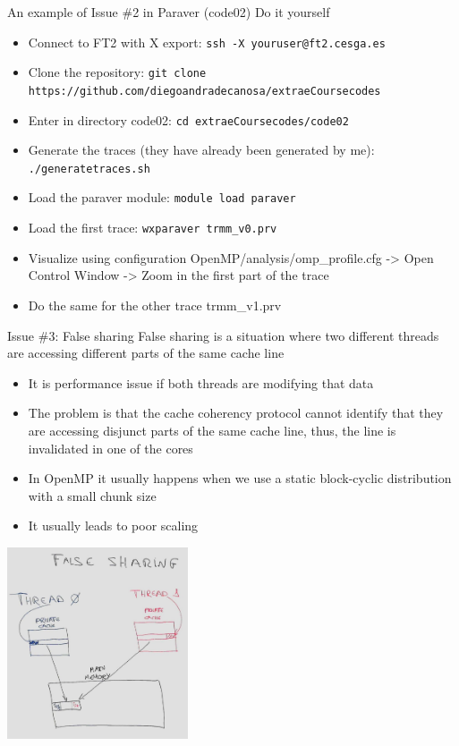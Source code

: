 \documentclass[10pt,xcolor=table]{beamer}
\begin{document}
\begin{frame}{An example of Issue \#2 in Paraver (code02)}
Do it yourself
\begin{itemize}
    \item Connect to FT2 with X export: {\tt ssh -X youruser@ft2.cesga.es}
    \item Clone the repository: {\tt git clone https://github.com/diegoandradecanosa/extraeCoursecodes}
    \item Enter in directory code02: {\tt cd extraeCoursecodes/code02}
    \item Generate the traces (they have already been generated by me): {\tt ./generatetraces.sh}
    \item Load the paraver module:  {\tt module load paraver}
    \item Load the first trace: {\tt wxparaver trmm\_v0.prv}
    \item Visualize using configuration OpenMP/analysis/omp\_profile.cfg -> Open Control Window -> Zoom in the first part of the trace
    \item Do the same for the other trace trmm\_v1.prv
\end{itemize}
\end{frame}


\begin{frame}{Issue \#3: False sharing}
False sharing is a situation where two different threads are accessing different  parts of the same cache line
\begin{itemize}
    \footnotesize
    \item It is performance issue if both threads are modifying that data
    \item The problem is that the cache coherency protocol cannot identify that they are accessing disjunct parts of the same cache line, thus, the line is invalidated in one of the cores
    \item In OpenMP it usually happens when we use a static block-cyclic distribution with a small chunk size
    \item It usually leads to poor scaling
\end{itemize}
\centering
\includegraphics[width=0.4\textwidth]{figs/myfalsesharing.jpg}
\end{frame}
\end{document}
